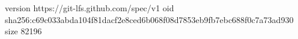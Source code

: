 version https://git-lfs.github.com/spec/v1
oid sha256:c69c033abda104f81dacf2e8ced6b068f08d7853eb9fb7ebc688f0c7a73ad930
size 82196
